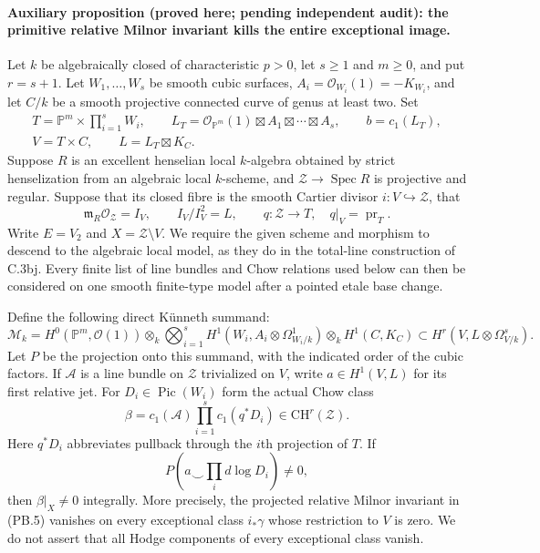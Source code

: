 \paragraph{Auxiliary proposition (proved here; pending independent audit):
the primitive relative Milnor invariant kills the entire exceptional image.}
Let $k$ be algebraically closed of characteristic $p>0$, let $s\geq1$
and $m\geq0$, and put $r=s+1$. Let $W_1,\ldots,W_s$ be smooth
cubic surfaces, $A_i=\mathcal O_{W_i}(1)=-K_{W_i}$, and let $C/k$
be a smooth projective connected curve of genus at least two. Set
\[
 \begin{gathered}
 T=\mathbb P^m\times\prod_{i=1}^sW_i,
 \qquad L_T=\mathcal O_{\mathbb P^m}(1)\boxtimes A_1\boxtimes\cdots\boxtimes A_s,
 \qquad b=c_1(L_T),\\
 V=T\times C,\qquad L=L_T\boxtimes K_C.
 \end{gathered}
 \tag{PB.1}
\]
Suppose $R$ is an excellent henselian local $k$-algebra obtained by
strict henselization from an algebraic local $k$-scheme, and
$\mathcal Z\to\operatorname{Spec}R$ is projective and regular.
Suppose that its closed fibre is the smooth Cartier divisor
$i:V\hookrightarrow\mathcal Z$, that
\[
 \mathfrak m_R\mathcal O_{\mathcal Z}=I_V,
 \qquad I_V/I_V^2=L,
 \qquad q:\mathcal Z\longrightarrow T,
 \quad q|_V=\operatorname{pr}_T.
 \tag{PB.2}
\]
Write $E=V_2$ and $X=\mathcal Z\setminus V$. We require the given
scheme and morphism to descend to the algebraic local model, as they
do in the total-line construction of C.3bj. Every finite list of
line bundles and Chow relations used below can then be considered on
one smooth finite-type model after a pointed etale base change.

Define the following direct K\"unneth summand:
\[
 \mathcal M_k=
 H^0(\mathbb P^m,\mathcal O(1))\otimes_k
 \bigotimes_{i=1}^s H^1(W_i,A_i\otimes\Omega^1_{W_i/k})
 \otimes_k H^1(C,K_C)
 \subset H^r(V,L\otimes\Omega^s_{V/k}).
 \tag{PB.3}
\]
Let $P$ be the projection onto this summand, with the indicated order
of the cubic factors. If $\mathcal A$ is a line bundle on $\mathcal Z$
trivialized on $V$, write $a\in H^1(V,L)$ for its first relative jet.
For $D_i\in\operatorname{Pic}(W_i)$ form the actual Chow class
\[
 \beta=c_1(\mathcal A)\prod_{i=1}^s c_1(q^*D_i)
                      \in\mathrm{CH}^{r}(\mathcal Z).
 \tag{PB.4}
\]
Here $q^*D_i$ abbreviates pullback through the $i$th projection of $T$.
If
\[
 P\left(a\smile\prod_i d\log D_i\right)\ne0,
 \tag{PB.5}
\]
then $\beta|_X\ne0$ integrally. More precisely, the projected
relative Milnor invariant in (PB.5) vanishes on every exceptional
class $i_*\gamma$ whose restriction to $V$ is zero. We do not assert
that all Hodge components of every exceptional class vanish.

